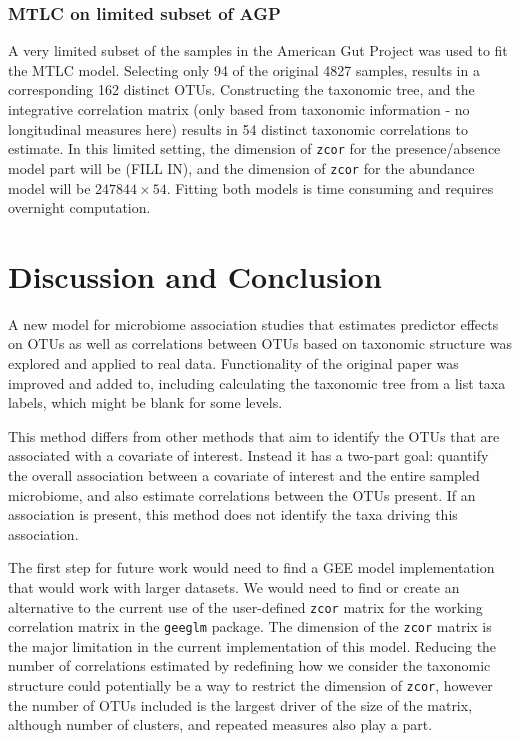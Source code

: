 \documentclass[12pt]{article}
\begin{document}
\subsubsection{MTLC on limited subset of AGP}

A very limited subset of the samples in the American Gut Project was used to fit the MTLC model. Selecting only 94 of the original 4827 samples, results in a corresponding 162 distinct OTUs. Constructing the taxonomic tree, and the integrative correlation matrix (only based from taxonomic information - no longitudinal measures here) results in 54 distinct taxonomic correlations to estimate. In this limited setting, the dimension of \texttt{zcor} for the presence/absence model part will be (FILL IN), and the dimension of \texttt{zcor} for the abundance model will be $247844 \times 54$. Fitting both models is time consuming and requires overnight computation.


\section{Discussion and Conclusion}

A new model for microbiome association studies that estimates predictor effects on OTUs as well as correlations between OTUs based on taxonomic structure was explored and applied to real data. Functionality of the original paper was improved and added to, including calculating the taxonomic tree from a list taxa labels, which might be blank for some levels.

This method differs from other methods that aim to identify the OTUs that are associated with a covariate of interest. Instead it has a two-part goal: quantify the overall association between a covariate of interest and the entire sampled microbiome, and also estimate correlations between the OTUs present. If an association is present, this method does not identify the taxa driving this association.

The first step for future work would need to find a GEE model implementation that would work with larger datasets. We would need to find or create an alternative to the current use of the user-defined \texttt{zcor} matrix for the working correlation matrix in the \texttt{geeglm} package. The dimension of the \texttt{zcor} matrix is the major limitation in the current implementation of this model. Reducing the number of correlations estimated by redefining how we consider the taxonomic structure could potentially be a way to restrict the dimension of \texttt{zcor}, however the number of OTUs included is the largest driver of the size of the matrix, although number of clusters, and repeated measures also play a part.
\end{document}
